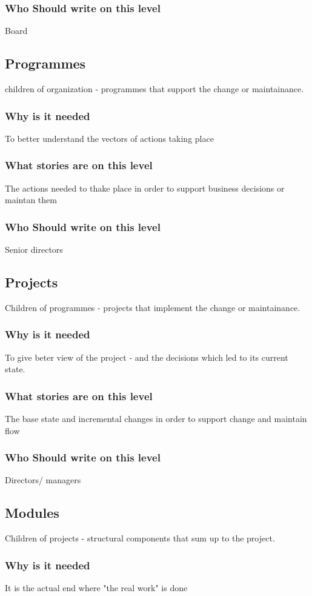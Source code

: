 \documentclass[12pt,a4paper,twoside]{article}
\begin{document}
\subsubsection{Who Should write on this level}
Board
\subsection{Programmes}
children of organization - programmes that support the change or maintainance.
\subsubsection{Why is it needed}
To better understand the vectors of actions taking place
\subsubsection{What stories are on this level}
The actions needed to thake place in order to support business decisions or maintan them
\subsubsection{Who Should write on this level}
Senior directors
\subsection{Projects}
Children of programmes - projects that implement the change or maintainance.
\subsubsection{Why is it needed}
To give beter view of the project - and the decisions which led to its current state. 
\subsubsection{What stories are on this level}
The base state and incremental changes in order to support change and maintain flow
\subsubsection{Who Should write on this level}
Directors/ managers
\subsection{Modules}
Children of projects - structural components that sum up to the project.
\subsubsection{Why is it needed}
It is the actual end where "the real work" is done
\end{document}
